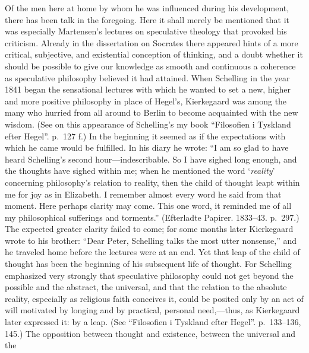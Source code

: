 \documentclass[12pt,a4paper]{book}
\newcommand{\opage}[1]{\marginnote{\footnotesize\textit{[#1]}}}
\begin{document}
Of the men here at home by whom he was influenced during his development,
there has been talk in the foregoing. Here it shall merely be mentioned
that it was especially Martensen's lectures on speculative theology that
provoked his criticism. Already in the dissertation on Socrates there
appeared hints of a more critical, subjective, and existential conception
of thinking, and a doubt whether it should be possible to give our
knowledge as smooth and continuous a coherence as speculative philosophy
believed it had attained. When Schelling in the year 1841 began the
sensational lectures with which he wanted to
\opage{55}set a new, higher and more positive philosophy in place of Hegel's,
Kierkegaard was among the many who hurried from all around to Berlin to
become acquainted with the new wisdom.
(See on this appearance of Schelling's my book ``Filosofien
i Tyskland efter Hegel''. p.~127 f.) In the beginning it seemed as if the
expectations with which he came would be fulfilled. In his diary he
wrote: ``I am so glad to have heard Schelling's second
hour---indescribable. So I have sighed long enough, and the thoughts have
sighed within me; when he mentioned the word `\textit{reality}' concerning
philosophy's relation to reality, then the child of thought leapt within
me for joy as in Elizabeth. I remember almost every word he said from
that moment. Here perhaps clarity may come. This one word, it reminded me
of all my philosophical sufferings and torments.''
(Efterladte Papirer. 1833--43. p.~297.) The expected greater clarity
failed to come; for some months later Kierkegaard wrote to his brother:
``Dear Peter, Schelling talks the most utter nonsense,'' and he traveled
home before the lectures were at an end. Yet that leap of the child of
thought has been the beginning of his subsequent life of thought. For
Schelling emphasized very strongly that speculative philosophy could not
get beyond the possible and the abstract, the universal, and that the
relation to the absolute reality, especially as religious faith conceives
it, could be posited only by an act of will motivated by longing and by
practical, personal need,---thus, as Kierkegaard later expressed it: by a
leap.
(See ``Filosofien i Tyskland efter Hegel''. p.~133--136, 145.) The
opposition between thought and existence, between the universal and the
\end{document}
